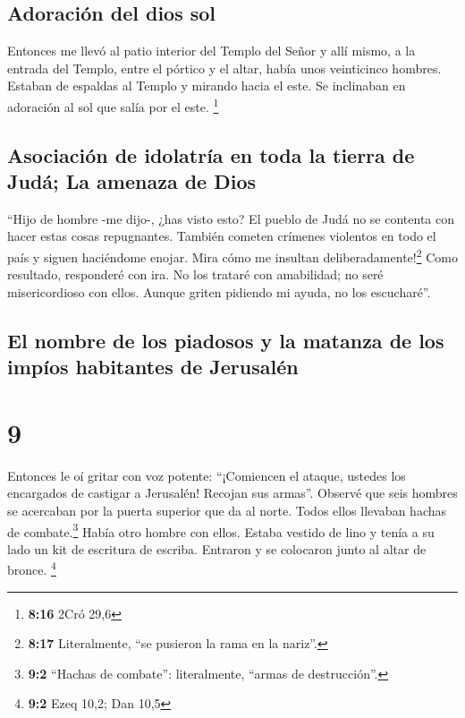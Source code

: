 \hypertarget{adoraciuxf3n-del-dios-sol}{%
\subsection{Adoración del dios sol}\label{adoraciuxf3n-del-dios-sol}}

 Entonces me llevó al patio interior del Templo del Señor
y allí mismo, a la entrada del Templo, entre el pórtico y el altar,
había unos veinticinco hombres. Estaban de espaldas al Templo y mirando
hacia el este. Se inclinaban en adoración al sol que salía por el este.
\footnote{\textbf{8:16} 2Cró 29,6}

\hypertarget{asociaciuxf3n-de-idolatruxeda-en-toda-la-tierra-de-juduxe1-la-amenaza-de-dios}{%
\subsection{Asociación de idolatría en toda la tierra de Judá; La
amenaza de
Dios}\label{asociaciuxf3n-de-idolatruxeda-en-toda-la-tierra-de-juduxe1-la-amenaza-de-dios}}

 ``Hijo de hombre -me dijo-, ¿has visto esto? El pueblo
de Judá no se contenta con hacer estas cosas repugnantes. También
cometen crímenes violentos en todo el país y siguen haciéndome enojar.
Mira cómo me insultan deliberadamente!\footnote{\textbf{8:17}
  Literalmente, ``se pusieron la rama en la nariz''.} 
Como resultado, responderé con ira. No los trataré con amabilidad; no
seré misericordioso con ellos. Aunque griten pidiendo mi ayuda, no los
escucharé''.

\hypertarget{el-nombre-de-los-piadosos-y-la-matanza-de-los-impuxedos-habitantes-de-jerusaluxe9n}{%
\subsection{El nombre de los piadosos y la matanza de los impíos
habitantes de
Jerusalén}\label{el-nombre-de-los-piadosos-y-la-matanza-de-los-impuxedos-habitantes-de-jerusaluxe9n}}

\hypertarget{section-8}{%
\section{9}\label{section-8}}

 Entonces le oí gritar con voz potente: ``¡Comiencen el
ataque, ustedes los encargados de castigar a Jerusalén! Recojan sus
armas''.  Observé que seis hombres se acercaban por la
puerta superior que da al norte. Todos ellos llevaban hachas de
combate.\footnote{\textbf{9:2} ``Hachas de combate'': literalmente,
  ``armas de destrucción''.} Había otro hombre con ellos. Estaba vestido
de lino y tenía a su lado un kit de escritura de escriba. Entraron y se
colocaron junto al altar de bronce. \footnote{\textbf{9:2} Ezeq 10,2;
  Dan 10,5}

